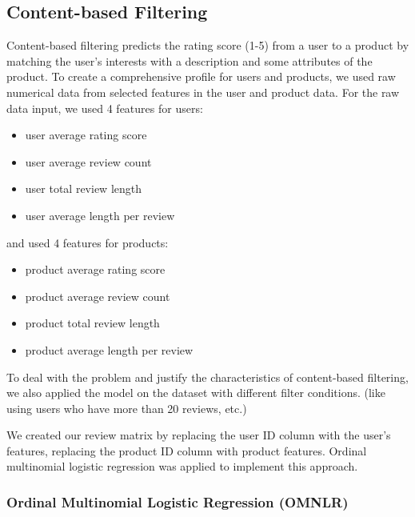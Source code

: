 \documentclass[sigconf]{acmart}
\begin{document}
\subsection{Content-based Filtering}
Content-based filtering predicts the rating score (1-5) from a user to a product by matching the user’s interests with a description and some attributes of the product. To create a comprehensive profile for users and products, we used raw numerical data from selected features in the user and product data. For the raw data input, we used 4 features for users:
\begin{itemize}
\item user average rating score
\item user average review count
\item user total review length
\item user average length per review
\end{itemize}
and used 4 features for products:
\begin{itemize}
\item product average rating score
\item product average review count
\item product total review length
\item product average length per review
\end{itemize}
To deal with the problem and justify the characteristics of content-based filtering, we also applied the model on the dataset with different filter conditions. (like using users who have more than 20 reviews, etc.)

We created our review matrix by replacing the user ID column with the user’s features, replacing the product ID column with product features. Ordinal multinomial logistic regression was applied to implement this approach.

\subsubsection{Ordinal Multinomial Logistic Regression (OMNLR)}
\end{document}
